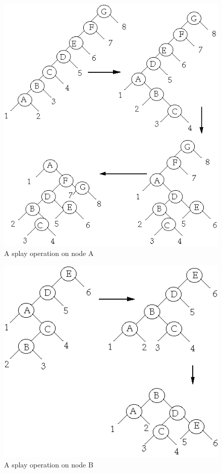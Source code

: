 \documentclass{article}
\begin{document}
\begin{figure}[!htpb]
	\label{fig:splay}
	\begin{center}
		\includegraphics[width=0.7\columnwidth, height=0.7\columnwidth, keepaspectratio]{splay.GIF}
	\end{center}
	\caption{A splay operation on node A}
\end{figure}
\begin{figure}[!htpb]
	\label{fig:splay2}
	\begin{center}
		\includegraphics[width=0.5\columnwidth,height=0.5\columnwidth,keepaspectratio]{splay2.gif}
	\end{center}
	\caption{A splay operation on node B}
\end{figure}
\end{document}
